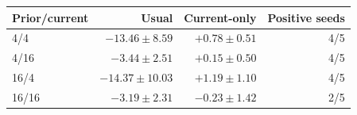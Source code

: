 \begin{tabular}{lrrr}
\toprule
Prior/current & Usual & Current-only & Positive seeds\\
\midrule
4/4 & $-13.46\pm8.59$ & $+0.78\pm0.51$ & 4/5\\
4/16 & $-3.44\pm2.51$ & $+0.15\pm0.50$ & 4/5\\
16/4 & $-14.37\pm10.03$ & $+1.19\pm1.10$ & 4/5\\
16/16 & $-3.19\pm2.31$ & $-0.23\pm1.42$ & 2/5\\
\bottomrule
\end{tabular}
